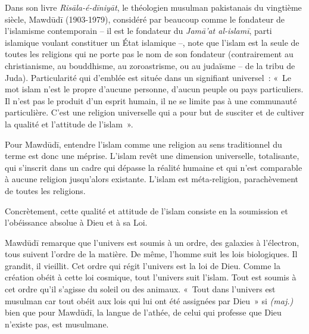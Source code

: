 
Dans son livre \emph{Risāla-é-dīniyāt}, le théologien musulman
pakistanais du vingtième siècle, Mawdūdī (1903-1979), considéré par
beaucoup comme le fondateur de l'islamisme contemporain -- il est le fondateur du \emph{Jamā'at
al-islamī}, parti islamique voulant constituer un État islamique --,
note que l'islam est la seule de toutes les religions qui ne porte pas
le nom de son fondateur (contrairement au christianisme, au bouddhisme, au zoroastrisme,
ou au judaïsme -- de la tribu de Juda). Particularité qui d'emblée est
située dans un signifiant universel~: «~Le mot islam n'est le propre
d'aucune personne, d'aucun peuple ou pays particuliers. Il n'est pas le
produit d'un esprit humain, il ne se limite pas à une communauté
particulière. C'est une religion universelle qui a pour but de susciter
et de cultiver la qualité et l'attitude de l'islam~».

Pour Mawdūdī, entendre l'islam comme une religion au sens traditionnel
du terme est donc une méprise. L'islam revêt une dimension universelle,
totalisante, qui s'inscrit dans un cadre qui dépasse la réalité humaine
et qui n'est comparable à aucune religion jusqu'alors existante. L'islam
est méta-religion, parachèvement de toutes les religions.

Concrètement, cette qualité et attitude de l'islam consiste en la
soumission et l'obéissance absolue à Dieu et à sa Loi.

Mawdūdī remarque que l'univers est soumis à un ordre, des galaxies à
l'électron, tous suivent l'ordre de la matière. De même, l'homme suit
les lois biologiques. Il grandit, il vieillit. Cet ordre qui régit
l'univers est la loi de Dieu. Comme la création obéit à cette loi
cosmique, tout l'univers suit l'islam. Tout est soumis à cet ordre qu'il
s'agisse du soleil ou des animaux. «~Tout dans l'univers est musulman
car tout obéit aux lois qui lui ont été assignées par Dieu~» si \emph{(maj.)} bien que pour Mawdūdī, la langue de l'athée,
de celui qui professe que Dieu n'existe pas, est musulmane.

